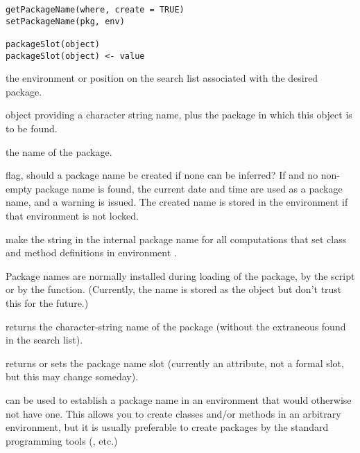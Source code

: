 %
\begin{Usage}
\begin{verbatim}
getPackageName(where, create = TRUE)
setPackageName(pkg, env)

packageSlot(object)
packageSlot(object) <- value
\end{verbatim}
\end{Usage}
%
\begin{Arguments}
\begin{ldescription}
\item[\code{where}] the environment or position on the search list
associated with the desired package.
\item[\code{object}] object providing a character string name, plus the
package in which this object is to be found.
\item[\code{value}] the name of the package.
\item[\code{create}] flag, should a package name be created if none can be
inferred?  If  and no non-empty package name is found,
the current date and time are used as a package name, and a
warning is issued. The created name is stored in the environment
if that environment is not locked.
\item[\code{pkg, env}] make the string in  the internal
package name for all computations that set class and method
definitions in environment .
\end{ldescription}
\end{Arguments}
%
\begin{Details}\relax
Package names are normally installed during loading of the package,
by the  script or by the 
function.  (Currently, the name is stored as the object
 but don't trust this for the future.)
\end{Details}
%
\begin{Value}
 returns the character-string name of the package
(without the extraneous  found in the search list).

 returns or sets the package name slot (currently
an attribute, not a formal slot, but this may change someday).

 can be used to establish a package name in an
environment that would otherwise not have one.  This
allows you to create classes and/or methods in an arbitrary
environment, but it is usually preferable to create packages by the
standard \R{} programming tools (, etc.)
\end{Value}

